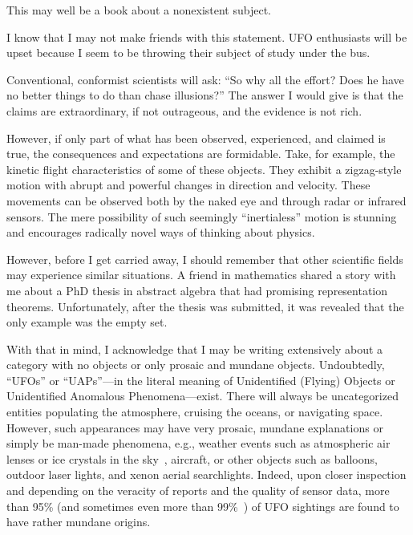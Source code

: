 %
%

\preface\label{preface}

This may well be a book about a nonexistent subject.

I know that I may not make friends with this statement. UFO enthusiasts will be upset because I seem to be throwing their subject of study under the bus.

Conventional, conformist scientists will ask: ``So why all the effort? Does he have no better things to do than chase illusions?''
The answer I would give is that the claims are extraordinary, if not outrageous, and the evidence is not rich.

However, if only part of what has been observed, experienced, and claimed is true, the consequences and expectations are formidable.
Take, for example, the kinetic flight characteristics of some of these objects.
They exhibit a zigzag-style motion with abrupt and powerful changes in direction and velocity.
These movements can be observed both by the naked eye and through radar or infrared sensors.
The mere possibility of such seemingly ``inertialess'' motion is stunning and encourages radically
novel ways of thinking about physics.

However, before I get carried away, I should remember that other scientific fields may experience similar situations.
A friend in mathematics shared a story with me about a PhD thesis in abstract algebra that had promising representation theorems.
Unfortunately, after the thesis was submitted, it was revealed that the only example was the empty set.

With that in mind, I acknowledge that I may be writing extensively about a category with no objects or only prosaic and mundane objects.
Undoubtedly, ``UFOs'' or ``UAPs''---in the literal meaning of Unidentified (Flying) Objects or Unidentified Anomalous Phenomena---exist.
There will always be uncategorized entities populating the atmosphere, cruising the oceans, or navigating space.
However, such appearances may have very prosaic, mundane explanations or simply be man-made phenomena, e.g., weather events such as atmospheric air lenses or
ice crystals in the sky~\cite{Menzel_1953}, aircraft, or other objects such as balloons, outdoor laser lights, and xenon aerial searchlights.
Indeed, upon closer inspection and
depending on the veracity of reports and the quality of sensor data, more than 95{\%}
(and sometimes even more than 99{\%}~\cite{AA-Condon-1970})
of UFO sightings are found to have rather mundane origins.


